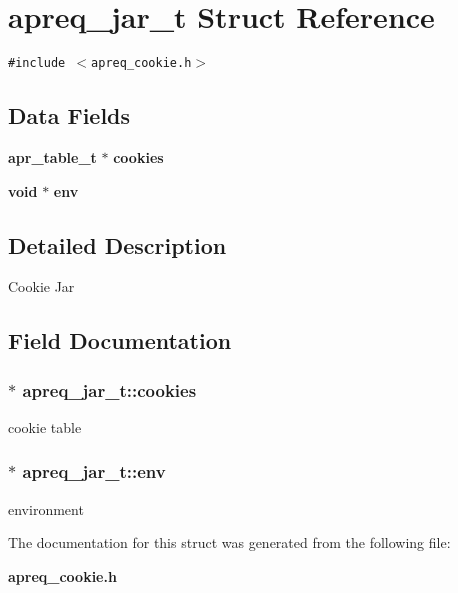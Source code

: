 \section{apreq\_\-jar\_\-t  Struct Reference}
\label{structapreq__jar__t}
{\tt \#include $<$apreq\_\-cookie.h$>$}

\subsection*{Data Fields}
\begin{CompactItemize}
\item 
{\bf apr\_\-table\_\-t} $\ast$ {\bf cookies}
\item 
{\bf void} $\ast$ {\bf env}
\end{CompactItemize}


\subsection{Detailed Description}
Cookie Jar 



\subsection{Field Documentation}
\subsubsection{$\ast$ apreq\_\-jar\_\-t::cookies}\label{structapreq__jar__t_m0}


cookie table 
\subsubsection{$\ast$ apreq\_\-jar\_\-t::env}\label{structapreq__jar__t_m1}


environment 

The documentation for this struct was generated from the following file:\begin{CompactItemize}
\item 
{\bf apreq\_\-cookie.h}\end{CompactItemize}
